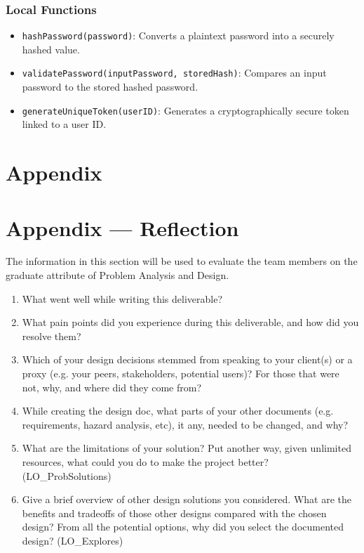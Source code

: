 \documentclass[12pt, titlepage]{article}
\begin{document}
\subsubsection{Local Functions}

\begin{itemize}
    \item \texttt{hashPassword(password)}: Converts a plaintext password into a securely hashed value.
    \item \texttt{validatePassword(inputPassword, storedHash)}: Compares an input password to the stored hashed password.
    \item \texttt{generateUniqueToken(userID)}: Generates a cryptographically secure token linked to a user ID.
\end{itemize}

\newpage

\section{Appendix} \label{Appendix}


\newpage{}

\section*{Appendix --- Reflection}


The information in this section will be used to evaluate the team members on the
graduate attribute of Problem Analysis and Design.



\begin{enumerate}
  \item What went well while writing this deliverable? 
  \item What pain points did you experience during this deliverable, and how
    did you resolve them?
  \item Which of your design decisions stemmed from speaking to your client(s)
  or a proxy (e.g. your peers, stakeholders, potential users)? For those that
  were not, why, and where did they come from?
  \item While creating the design doc, what parts of your other documents (e.g.
  requirements, hazard analysis, etc), it any, needed to be changed, and why?
  \item What are the limitations of your solution?  Put another way, given
  unlimited resources, what could you do to make the project better? (LO\_ProbSolutions)
  \item Give a brief overview of other design solutions you considered.  What
  are the benefits and tradeoffs of those other designs compared with the chosen
  design?  From all the potential options, why did you select the documented design?
  (LO\_Explores)
\end{enumerate}
\end{document}
